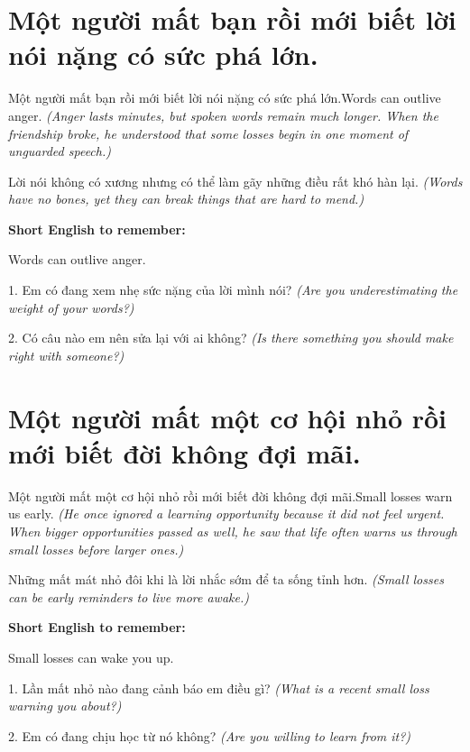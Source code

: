 \section{Một người mất bạn rồi mới biết lời nói nặng có sức phá lớn.}
\begin{truyen}{Một người mất bạn rồi mới biết lời nói nặng có sức phá lớn.}{Words can outlive anger.}
\textit{(Anger lasts minutes, but spoken words remain much longer. When the friendship broke, he understood that some losses begin in one moment of unguarded speech.)}
\end{truyen}
\begin{baihoc}
Lời nói không có xương nhưng có thể làm gãy những điều rất khó hàn lại.
\textit{(Words have no bones, yet they can break things that are hard to mend.)}
\end{baihoc}
\begin{ghinhoanh}\textbf{Short English to remember:}

Words can outlive anger.
\end{ghinhoanh}
\begin{tuhocnhanh}
1. Em có đang xem nhẹ sức nặng của lời mình nói? \textit{(Are you underestimating the weight of your words?)}

2. Có câu nào em nên sửa lại với ai không? \textit{(Is there something you should make right with someone?)}
\end{tuhocnhanh}
\ngancach

\section{Một người mất một cơ hội nhỏ rồi mới biết đời không đợi mãi.}
\begin{truyen}{Một người mất một cơ hội nhỏ rồi mới biết đời không đợi mãi.}{Small losses warn us early.}
\textit{(He once ignored a learning opportunity because it did not feel urgent. When bigger opportunities passed as well, he saw that life often warns us through small losses before larger ones.)}
\end{truyen}
\begin{baihoc}
Những mất mát nhỏ đôi khi là lời nhắc sớm để ta sống tỉnh hơn.
\textit{(Small losses can be early reminders to live more awake.)}
\end{baihoc}
\begin{ghinhoanh}\textbf{Short English to remember:}

Small losses can wake you up.
\end{ghinhoanh}
\begin{tuhocnhanh}
1. Lần mất nhỏ nào đang cảnh báo em điều gì? \textit{(What is a recent small loss warning you about?)}

2. Em có đang chịu học từ nó không? \textit{(Are you willing to learn from it?)}
\end{tuhocnhanh}
\ngancach